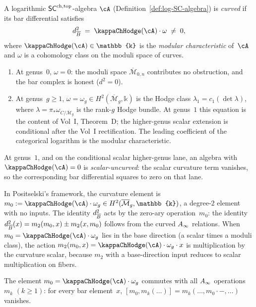 \begin{definition}
\label{def:curved-Ainf-chiral}
A logarithmic $\mathsf{SC}^{\mathrm{ch},\mathrm{top}}$-algebra $\cA$
(Definition~\ref{def:log-SC-algebra}) is \emph{curved}
if its bar differential satisfies
\[
 d_{\barB}^2 \;=\; \kappaChHodge(\cA) \cdot \omega
 \;\neq\; 0,
\]
where $\kappaChHodge(\cA) \in \mathbb{k}$ is the \emph{modular
characteristic} of~$\cA$ and $\omega$ is a cohomology class on the
moduli space of curves.
\begin{enumerate}[label=\textup{(\roman*)}]
\item At genus~$0$, $\omega = 0$: the moduli space
 $\overline{\mathcal M}_{0,n}$ contributes no obstruction, and the
 bar complex is honest ($d^2 = 0$).
\item At genus~$g \geq 1$, $\omega = \omega_g \in
 H^2(\overline{\mathcal M}_g, \mathbb{k})$ is the Hodge class
 $\lambda_1 = c_1(\det \lambda)$, where
 $\lambda = \pi_* \omega_{C/\overline{\mathcal M}_g}$ is the
 rank-$g$ Hodge bundle.
 At genus~$1$ this equation is the content of Vol~I,
 Theorem~D; the higher-genus scalar extension is conditional
 after the Vol~I rectification. The leading coefficient of the
 categorical logarithm is the modular characteristic.
\end{enumerate}
At genus~$1$, and on the conditional scalar higher-genus lane, an
algebra with $\kappaChHodge(\cA)=0$ is \emph{scalar-uncurved}: the scalar
curvature term vanishes, so the corresponding bar differential squares
to zero on that lane.
\end{definition}

In Positselski's framework, the curvature element is
$m_0 := \kappaChHodge(\cA) \cdot \omega_g
 \in H^2(\overline{\mathcal M}_g, \mathbb{k})$,
a degree-$2$ element with no inputs. The identity
$d_{\overline{B}}^2$ acts by the zero-ary operation~$m_0$: the identity
$d_{\overline{B}}^2(x) = m_2(m_0, x) \pm m_2(x, m_0)$ follows from the
curved $A_\infty$ relations. When
$m_0 = \kappaChHodge(\cA) \cdot \omega_g$ lies in the base direction (a
scalar times a moduli class), the action $m_2(m_0, x) = \kappaChHodge(\cA)
\cdot \omega_g \cdot x$ is multiplication by the curvature scalar,
because $m_2$ with a base-direction input reduces to scalar
multiplication on fibers.

\begin{lemma}
\label{lem:curvature-centrality}
The element $m_0 = \kappaChHodge(\cA) \cdot \omega_g$ commutes with all\/
$A_\infty$ operations $m_k$ $(k \geq 1)$: for every bar element~$x$,
$[m_0, m_k(\ldots)] = m_k(\ldots, m_0 \cdot -, \ldots)$ vanishes.
\end{lemma}

